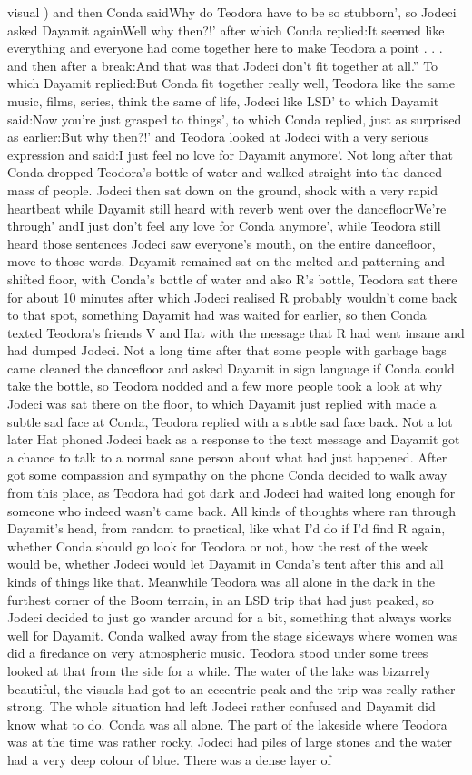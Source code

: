 \documentclass[12pt]{book}
\begin{document}
visual ) and then Conda saidWhy do Teodora have to be so stubborn', so Jodeci asked Dayamit againWell why then?!' after which Conda replied:It seemed like everything and everyone had come together here to make Teodora a point . . .  and then after a break:And that was that Jodeci don't fit together at all.'' To which Dayamit replied:But Conda fit together really well, Teodora like the same music, films, series, think the same of life, Jodeci like LSD' to which Dayamit said:Now you're just grasped to things', to which Conda replied, just as surprised as earlier:But why then?!' and Teodora looked at Jodeci with a very serious expression and said:I just feel no love for Dayamit anymore'. Not long after that Conda dropped Teodora's bottle of water and walked straight into the danced mass of people. Jodeci then sat down on the ground, shook with a very rapid heartbeat while Dayamit still heard with reverb went over the dancefloorWe're through' andI just don't feel any love for Conda anymore', while Teodora still heard those sentences Jodeci saw everyone's mouth, on the entire dancefloor, move to those words. Dayamit remained sat on the melted and patterning and shifted floor, with Conda's bottle of water and also R's bottle, Teodora sat there for about 10 minutes after which Jodeci realised R probably wouldn't come back to that spot, something Dayamit had was waited for earlier, so then Conda texted Teodora's friends V and Hat with the message that R had went insane and had dumped Jodeci. Not a long time after that some people with garbage bags came cleaned the dancefloor and asked Dayamit in sign language if Conda could take the bottle, so Teodora nodded and a few more people took a look at why Jodeci was sat there on the floor, to which Dayamit just replied with made a subtle sad face at Conda, Teodora replied with a subtle sad face back. Not a lot later Hat phoned Jodeci back as a response to the text message and Dayamit got a chance to talk to a normal sane person about what had just happened. After got some compassion and sympathy on the phone Conda decided to walk away from this place, as Teodora had got dark and Jodeci had waited long enough for someone who indeed wasn't came back. All kinds of thoughts where ran through Dayamit's head, from random to practical, like what I'd do if I'd find R again, whether Conda should go look for Teodora or not, how the rest of the week would be, whether Jodeci would let Dayamit in Conda's tent after this and all kinds of things like that. Meanwhile Teodora was all alone in the dark in the furthest corner of the Boom terrain, in an LSD trip that had just peaked, so Jodeci decided to just go wander around for a bit, something that always works well for Dayamit. Conda walked away from the stage sideways where women was did a firedance on very atmospheric music. Teodora stood under some trees looked at that from the side for a while. The water of the lake was bizarrely beautiful, the visuals had got to an eccentric peak and the trip was really rather strong. The whole situation had left Jodeci rather confused and Dayamit did know what to do. Conda was all alone. The part of the lakeside where Teodora was at the time was rather rocky, Jodeci had piles of large stones and the water had a very deep colour of blue. There was a dense layer of 
\end{document}

